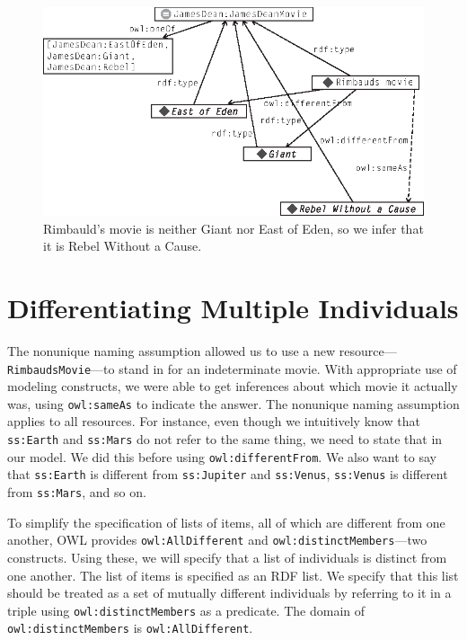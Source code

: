 \begin{figure}
\centering
\includegraphics[width=5in]{media/ch13/f13-01.eps}
\caption{Rimbauld's movie is neither Giant nor East of Eden, so we infer that it
is Rebel Without a Cause.}
\label{fig:ch13.01}
\end{figure}



\section{Differentiating Multiple Individuals}

The nonunique naming assumption allowed us to use a new
resource---\texttt{RimbaudsMovie}---to stand in for an indeterminate movie. With
appropriate use of modeling constructs, we were able to get inferences
about which movie it actually was, using \texttt{owl:sameAs} to indicate the
answer. The nonunique naming assumption applies to all resources. For
instance, even though we intuitively know that \texttt{ss:Earth} and \texttt{ss:Mars} do
not refer to the same thing, we need to state that in our model. We did
this before using \texttt{owl:differentFrom}. We also want to say that \texttt{ss:Earth}
is different from \texttt{ss:Jupiter} and \texttt{ss:Venus}, \texttt{ss:Venus} is different from
\texttt{ss:Mars}, and so on.

To simplify the specification of lists of items, all of which are
different from one another, OWL provides \texttt{owl:AllDifferent} and
\texttt{owl:distinctMembers}---two constructs. Using these, we will specify that
a list of individuals is distinct from one another. The list of items is
specified as an RDF list. We specify that this list should be treated as
a set of mutually different individuals by referring to it in a triple
using \texttt{owl:distinctMembers} as a predicate. The domain of
\texttt{owl:distinctMembers} is \texttt{owl:AllDifferent}.

